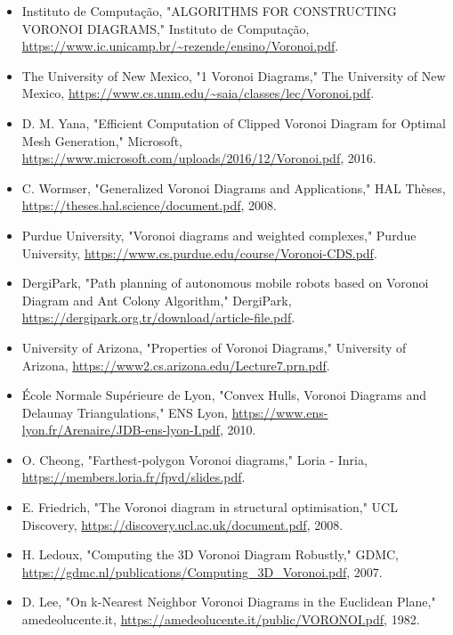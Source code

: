 \documentclass[12pt,a4paper]{report}
\begin{document}
\begin{itemize}
  \item Instituto de Computação, "ALGORITHMS FOR CONSTRUCTING VORONOI DIAGRAMS," Instituto de Computação, \url{https://www.ic.unicamp.br/~rezende/ensino/Voronoi.pdf}.
  
  \item The University of New Mexico, "1 Voronoi Diagrams," The University of New Mexico, \url{https://www.cs.unm.edu/~saia/classes/lec/Voronoi.pdf}.
  
  \item D. M. Yana, "Efficient Computation of Clipped Voronoi Diagram for Optimal Mesh Generation," Microsoft, \url{https://www.microsoft.com/uploads/2016/12/Voronoi.pdf}, 2016.
  
  \item C. Wormser, "Generalized Voronoi Diagrams and Applications," HAL Thèses, \url{https://theses.hal.science/document.pdf}, 2008.
  
  \item Purdue University, "Voronoi diagrams and weighted complexes," Purdue University, \url{https://www.cs.purdue.edu/course/Voronoi-CDS.pdf}.
  
  \item DergiPark, "Path planning of autonomous mobile robots based on Voronoi Diagram and Ant Colony Algorithm," DergiPark, \url{https://dergipark.org.tr/download/article-file.pdf}.
  
  \item University of Arizona, "Properties of Voronoi Diagrams," University of Arizona, \url{https://www2.cs.arizona.edu/Lecture7.prn.pdf}.
  
  \item École Normale Supérieure de Lyon, "Convex Hulls, Voronoi Diagrams and Delaunay Triangulations," ENS Lyon, \url{https://www.ens-lyon.fr/Arenaire/JDB-ens-lyon-I.pdf}, 2010.
  
  \item O. Cheong, "Farthest-polygon Voronoi diagrams," Loria - Inria, \url{https://members.loria.fr/fpvd/slides.pdf}.
  
  \item E. Friedrich, "The Voronoi diagram in structural optimisation," UCL Discovery, \url{https://discovery.ucl.ac.uk/document.pdf}, 2008.
  
  \item H. Ledoux, "Computing the 3D Voronoi Diagram Robustly," GDMC, \url{https://gdmc.nl/publications/Computing_3D_Voronoi.pdf}, 2007.
  
  \item D. Lee, "On k-Nearest Neighbor Voronoi Diagrams in the Euclidean Plane," amedeolucente.it, \url{https://amedeolucente.it/public/VORONOI.pdf}, 1982.
  

\end{itemize}
\end{document}
